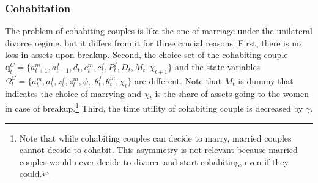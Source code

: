 \documentclass[12pt]{article}
\numberwithin{table}{section}
\begin{document}
\subsubsection*{Cohabitation}
The problem of cohabiting couples is like the one of marriage under the unilateral divorce regime, but it differs from it for three crucial reasons. First, there is no loss in assets upon breakup. Second, the choice set of the cohabiting couple $\mathbf{q}^C_t=\{a^m_{t+1},a^f_{t+1},d_t,c^m_t,c^f_t,P^f_t,D_t,M_t,\chi_{t+1}\}$ and the state variables $\Omega^{C}_t=\{a^m_t,a^f_t,z^f_t,z^m_t,\psi_t,\theta^f_t,\theta^m_t,\chi_t\}$ are different. Note that $M_t$ is dummy that indicates the choice of marrying and $\chi_t$ is the share of assets going to the women in case of breakup.\footnote{Note that while cohabiting couples can decide to marry, married couples cannot decide to cohabit. This asymmetry is not relevant because married couples would never decide to divorce and start cohabiting, even if they could.} Third, the time utility of cohabiting couple is decreased by $\gamma$.
\end{document}
